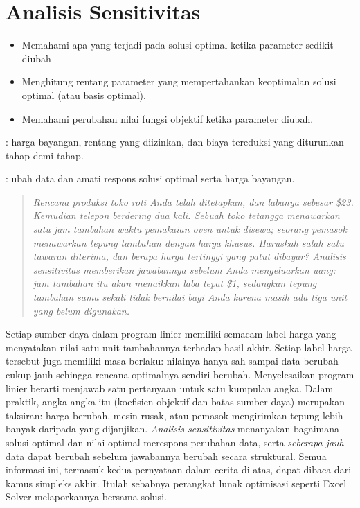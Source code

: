 
\chapter{Analisis Sensitivitas}
\label{ch:sensitivity}
\begin{outcome}
\begin{itemize}
\item Memahami apa yang terjadi pada solusi optimal ketika parameter sedikit diubah
\item Menghitung rentang parameter yang mempertahankan keoptimalan solusi optimal (atau basis optimal).
\item Memahami perubahan nilai fungsi objektif ketika parameter diubah.
\end{itemize}
\end{outcome}

\begin{tryit}
: harga bayangan, rentang yang diizinkan, dan biaya tereduksi yang diturunkan tahap demi tahap.

: ubah data dan amati respons solusi optimal serta harga bayangan.
\end{tryit}



\begin{quote}
\itshape Rencana produksi toko roti Anda telah ditetapkan, dan labanya sebesar \$23. Kemudian telepon berdering dua kali. Sebuah toko tetangga menawarkan satu jam tambahan waktu pemakaian oven untuk disewa; seorang pemasok menawarkan tepung tambahan dengan harga khusus. Haruskah salah satu tawaran diterima, dan berapa harga tertinggi yang patut dibayar? Analisis sensitivitas memberikan jawabannya sebelum Anda mengeluarkan uang: jam tambahan itu akan menaikkan laba tepat \$1, sedangkan tepung tambahan sama sekali tidak bernilai bagi Anda karena masih ada tiga unit yang belum digunakan.
\end{quote}

Setiap sumber daya dalam program linier memiliki semacam label harga yang menyatakan nilai satu unit tambahannya terhadap hasil akhir. Setiap label harga tersebut juga memiliki masa berlaku: nilainya hanya sah sampai data berubah cukup jauh sehingga rencana optimalnya sendiri berubah. Menyelesaikan program linier berarti menjawab satu pertanyaan untuk satu kumpulan angka. Dalam praktik, angka-angka itu (koefisien objektif dan batas sumber daya) merupakan taksiran: harga berubah, mesin rusak, atau pemasok mengirimkan tepung lebih banyak daripada yang dijanjikan. \emph{Analisis sensitivitas} menanyakan bagaimana solusi optimal dan nilai optimal merespons perubahan data, serta \emph{seberapa jauh} data dapat berubah sebelum jawabannya berubah secara struktural. Semua informasi ini, termasuk kedua pernyataan dalam cerita di atas, dapat dibaca dari kamus simpleks akhir. Itulah sebabnya perangkat lunak optimisasi seperti Excel Solver melaporkannya bersama solusi.

